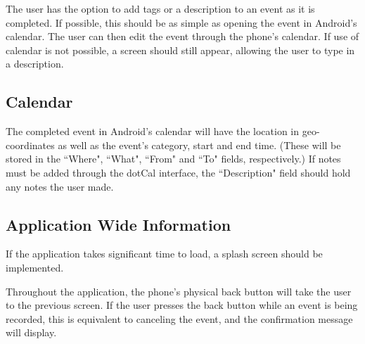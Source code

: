 \documentclass[11pt]{article}
\begin{document}
The user has the option to add tags or a description to an event as it is completed. If possible, this should be as simple as opening the event in Android's calendar. The user can then edit the event through the phone's calendar. If use of calendar is not possible, a screen should still appear, allowing the user to type in a description.

\subsection{Calendar}
The completed event in Android's calendar will have the location in geo-coordinates as well as the event's category, start and end time. (These will be stored in the ``Where", ``What", ``From" and ``To" fields, respectively.) If notes must be added through the dotCal interface, the ``Description" field should hold any notes the user made.

\subsection{Application Wide Information}

If the application takes significant time to load, a splash screen should be implemented.

Throughout the application, the phone's physical back button will take the user to the previous screen. If the user presses the back button while an event is being recorded, this is equivalent to canceling the event, and the confirmation message will display.
\end{document}
